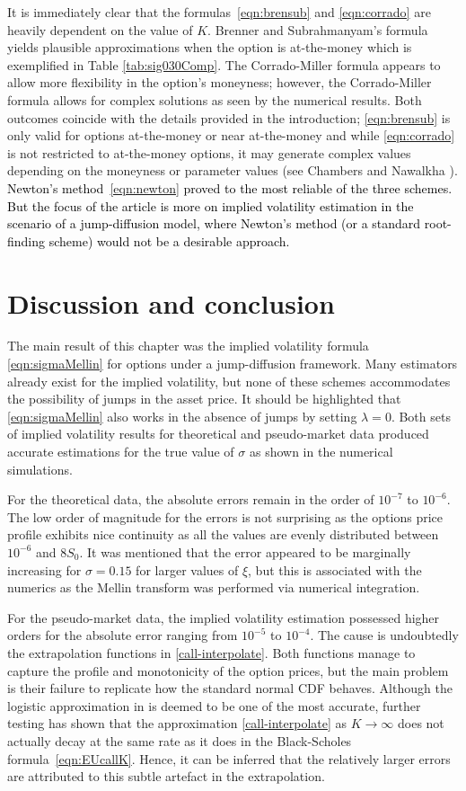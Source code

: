 It is immediately clear that the formulas~\eqref{eqn:brensub} and \eqref{eqn:corrado} are heavily dependent on the value of $K$. Brenner and Subrahmanyam's formula yields plausible approximations when the option is at-the-money which is exemplified in Table \ref{tab:sig030Comp}. The Corrado-Miller formula appears to allow more flexibility in the option's moneyness; however, the Corrado-Miller formula allows for complex solutions as seen by the numerical results. Both outcomes coincide with the details provided in the introduction; \eqref{eqn:brensub} is only valid for options at-the-money or near at-the-money and while \eqref{eqn:corrado} is not restricted to at-the-money options, it may generate complex values depending on the moneyness or parameter values (see Chambers and Nawalkha \cite{Chambers2001}). \textcolor{black}{Newton's method~\eqref{eqn:newton} proved to the most reliable of the three schemes. But the focus of the article is more on implied volatility estimation in the scenario of a jump-diffusion model, where Newton's method (or a standard root-finding scheme) would not be a desirable approach.}

\section{Discussion and conclusion}
The main result of this chapter was the implied volatility formula \eqref{eqn:sigmaMellin} for options under a jump-diffusion framework. Many estimators already exist for the implied volatility, but none of these schemes accommodates the possibility of jumps in the asset price. It should be highlighted that \eqref{eqn:sigmaMellin} also works in the absence of jumps by setting $\lambda = 0$. Both sets of implied volatility results for theoretical and pseudo-market data produced accurate estimations for the true value of $\sigma$ as shown in the numerical simulations.

For the theoretical data, the absolute errors remain in the order of $10^{-7}$ to $10^{-6}$. The low order of magnitude for the errors is not surprising as the options price profile exhibits nice continuity as all the values are evenly distributed between $10^{-6}$ and $8S_0$. It was mentioned that the error appeared to be marginally increasing for $\sigma = 0.15$ for larger values of $\xi$, but this is associated with the numerics as the Mellin transform was performed via numerical integration.

For the pseudo-market data, the implied volatility estimation possessed higher orders for the absolute error ranging from $10^{-5}$ to $10^{-4}$. The cause is undoubtedly the extrapolation functions in \eqref{call-interpolate}. Both functions manage to capture the profile and monotonicity of the option prices, but the main problem is their failure to replicate how the standard normal CDF behaves. Although the logistic approximation in \cite{Bowling2009} is deemed to be one of the most accurate, further testing has shown that the approximation \eqref{call-interpolate} as $K \rightarrow \infty$ does not actually decay at the same rate as it does in the Black-Scholes formula~\eqref{eqn:EUcallK}. Hence, it can be inferred that the relatively larger errors are attributed to this subtle artefact in the extrapolation.

